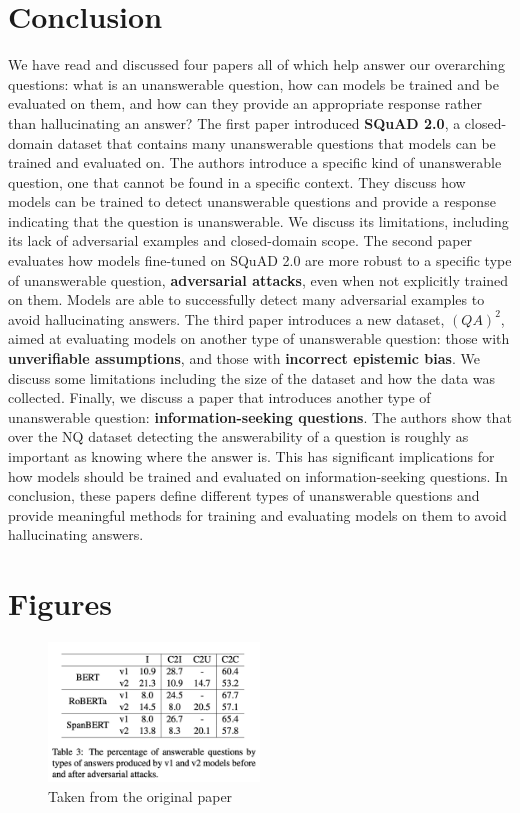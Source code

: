 \documentclass[letterpaper, 11pt]{article}
\begin{document}
\section{Conclusion}
\label{sec:conclusion}
We have read and discussed four papers all of which help answer our overarching questions: what is an unanswerable question, how can models be trained and be evaluated on them, and how can they provide an appropriate response rather than hallucinating an answer? The first paper introduced \textbf{SQuAD 2.0},
a closed-domain dataset that contains many unanswerable questions that models can be trained and evaluated on. The authors introduce a specific kind of unanswerable question, one that cannot be found in a specific context. They discuss how models can be trained to detect unanswerable questions and provide a response indicating that the question is unanswerable.
We discuss its limitations, including its lack of adversarial examples and closed-domain scope.
The second paper evaluates how models fine-tuned on SQuAD 2.0 are more robust to a specific type of unanswerable question, \textbf{adversarial attacks}, even when not explicitly trained on them. Models are able to successfully detect many adversarial examples to avoid hallucinating answers. The third paper introduces a new dataset, $(QA)^2$, aimed at evaluating models on another type of unanswerable question: those with \textbf{unverifiable assumptions}, and those with \textbf{incorrect epistemic bias}. We discuss some limitations including the size of the dataset and how the data was collected.
Finally, we discuss a paper that introduces another type of unanswerable question: \textbf{information-seeking questions}. The authors show that over the NQ dataset detecting the answerability of a question is roughly as important as knowing where the answer is. This has significant implications for how models should be trained and evaluated on information-seeking questions.
In conclusion, these papers define different types of unanswerable questions and provide meaningful methods for training and evaluating models on them to avoid hallucinating answers.

\section{Figures}
\begin{figure}[H]
    \centering
    \includegraphics[width=0.5\textwidth]{figure1.png}
    \caption{Taken from the original paper \citep{impactsofunanswerable}}
    \label{fig:figure1}
\end{figure}
\end{document}
